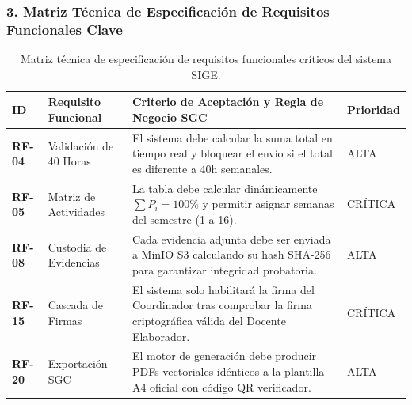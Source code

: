\documentclass[12pt,a4paper]{article}
\begin{document}
\subsubsection*{3. Matriz Técnica de Especificación de Requisitos Funcionales Clave}
\begin{table}[H]
\centering
\small
\renewcommand{\arraystretch}{1.2}
\begin{tabularx}{\textwidth}{|>{\hsize=0.45\hsize\centering\arraybackslash\bfseries\footnotesize}X|>{\hsize=0.95\hsize\raggedright\arraybackslash\footnotesize}X|>{\hsize=2.0\hsize\raggedright\arraybackslash\footnotesize}X|>{\hsize=0.6\hsize\centering\arraybackslash\footnotesize}X|}
\hline
\rowcolor{tableheader}
\textbf{ID} & \textbf{Requisito Funcional} & \textbf{Criterio de Aceptación y Regla de Negocio SGC} & \textbf{Prioridad} \\
\hline
RF-04 & Validación de 40 Horas & El sistema debe calcular la suma total en tiempo real y bloquear el envío si el total es diferente a 40h semanales. & ALTA \\
\hline
RF-05 & Matriz de Actividades & La tabla debe calcular dinámicamente $\sum P_i = 100\%$ y permitir asignar semanas del semestre (1 a 16). & CRÍTICA \\
\hline
RF-08 & Custodia de Evidencias & Cada evidencia adjunta debe ser enviada a MinIO S3 calculando su hash SHA-256 para garantizar integridad probatoria. & ALTA \\
\hline
RF-15 & Cascada de Firmas & El sistema solo habilitará la firma del Coordinador tras comprobar la firma criptográfica válida del Docente Elaborador. & CRÍTICA \\
\hline
RF-20 & Exportación SGC & El motor de generación debe producir PDFs vectoriales idénticos a la plantilla A4 oficial con código QR verificador. & ALTA \\
\hline
\end{tabularx}
\caption{Matriz técnica de especificación de requisitos funcionales críticos del sistema SIGE.}
\end{table}
\end{document}
